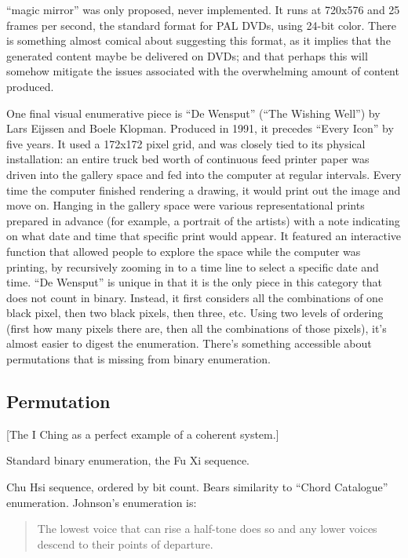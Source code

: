 \documentclass{thesis}
\begin{document}
	``magic mirror'' was only proposed, never implemented. It runs at 720x576 and 25 frames per second, the standard format for PAL DVDs, using 24-bit color. There is something almost comical about suggesting this format, as it implies that the generated content maybe be delivered on DVDs; and that perhaps this will somehow mitigate the issues associated with the overwhelming amount of content produced.
	
	One final visual enumerative piece is ``De Wensput'' (``The Wishing Well'') by Lars Eijssen and Boele Klopman.\cite{remko_scha_every_2001} Produced in 1991, it precedes ``Every Icon'' by five years. It used a 172x172 pixel grid, and was closely tied to its physical installation: an entire truck bed worth of continuous feed printer paper was driven into the gallery space and fed into the computer at regular intervals. Every time the computer finished rendering a drawing, it would print out the image and move on. Hanging in the gallery space were various representational prints prepared in advance (for example, a portrait of the artists) with a note indicating on what date and time that specific print would appear. It featured an interactive function that allowed people to explore the space while the computer was printing, by recursively zooming in to a time line to select a specific date and time. ``De Wensput'' is unique in that it is the only piece in this category that does not count in binary. Instead, it first considers all the combinations of one black pixel, then two black pixels, then three, etc. Using two levels of ordering (first how many pixels there are, then all the combinations of those pixels), it's almost easier to digest the enumeration. There's something accessible about permutations that is missing from binary enumeration.
	
\subsection{Permutation}

	[The I Ching as a perfect example of a coherent system.]
	
	Standard binary enumeration, the Fu Xi sequence.
	
	Chu Hsi sequence, ordered by bit count. Bears similarity to ``Chord Catalogue'' enumeration. Johnson's enumeration is:
	
	\begin{quote}
	The lowest voice that can rise a half-tone does so and any lower voices descend to their points of departure.
	\end{quote}
	
\end{document}

